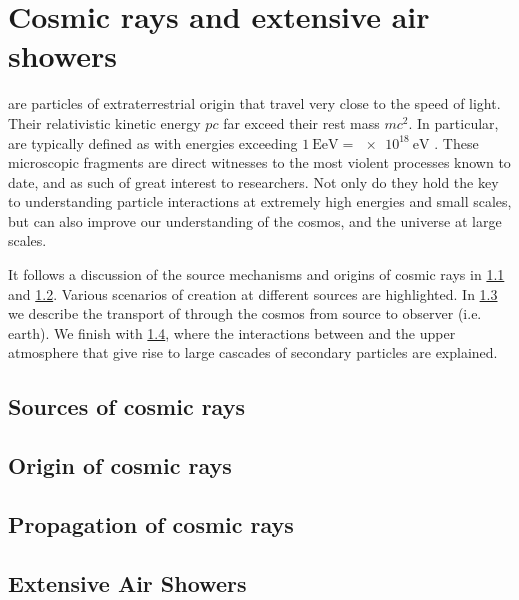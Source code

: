 
\chapter{Cosmic rays and extensive air showers}
\label{chap:cosmic-rays}

\CRs are particles of extraterrestrial origin that travel very close to the 
speed of light. Their relativistic kinetic energy $pc$ far exceed their rest 
mass $mc^2$. In particular, \UHECRs are typically defined as \CRs with energies
exceeding $\SI{1}{\exa\eV} = \SI{e18}{\eV}$ \cite{AlvesBatista2019}. These
microscopic fragments are direct witnesses to the most violent processes known
to date, and as such of great interest to researchers. Not only do they hold
the key to understanding particle interactions at extremely high energies and 
small scales, but can also improve our understanding of the cosmos, and the 
universe at large scales.

It follows a discussion of the source mechanisms and origins of cosmic rays in 
\cref{sec:cr-accelerators} and \cref{sec:cr-origins}. Various scenarios of \CR 
creation at different sources are highlighted. In \cref{sec:cr-propagation} we 
describe the transport of \CRs through the cosmos from source to observer (i.e. 
earth). We finish with \cref{sec:extensive-air-showers}, where the interactions 
between \CRs and the upper atmosphere that give rise to large cascades of 
secondary particles are explained.


\section{Sources of cosmic rays}
\label{sec:cr-accelerators}


\section{Origin of cosmic rays}
\label{sec:cr-origins}


\section{Propagation of cosmic rays}
\label{sec:cr-propagation}



\section{Extensive Air Showers}
\label{sec:extensive-air-showers}



